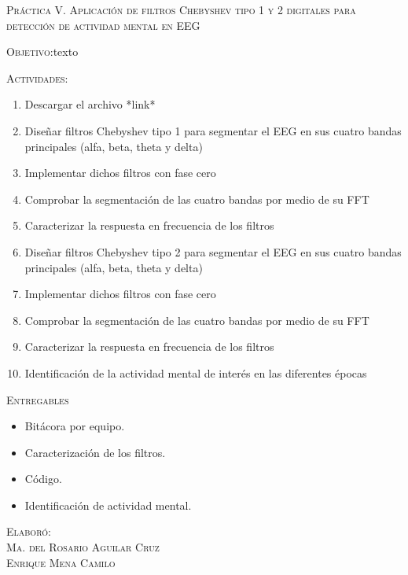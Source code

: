 \documentclass[10pt,letterpaper,spanish,twoside]{report}
\begin{document}
\docdate

\begin{center}
 \textsc{\asignatura}\vspace{.2em}
\end{center}

\textsc{Práctica V. Aplicación de filtros Chebyshev tipo 1 y 2 digitales para detección de actividad mental en EEG}

\textsc{Objetivo:}texto

\textsc{Actividades:}
\begin{enumerate}
  \item Descargar el archivo *link*
  \item Diseñar filtros Chebyshev tipo 1 para segmentar el EEG en sus cuatro bandas principales (alfa, beta, theta y delta)
  \item Implementar dichos filtros con fase cero
  \item Comprobar la segmentación de las cuatro bandas por medio de su FFT
  \item Caracterizar la respuesta en frecuencia de los filtros
  \item Diseñar filtros Chebyshev tipo 2 para segmentar el EEG en sus cuatro bandas principales (alfa, beta, theta y delta)
  \item Implementar dichos filtros con fase cero
  \item Comprobar la segmentación de las cuatro bandas por medio de su FFT
  \item Caracterizar la respuesta en frecuencia de los filtros
  \item Identificación de la actividad mental de interés en las diferentes épocas
\end{enumerate}

\textsc{Entregables}
\begin{itemize}
  \item Bitácora por equipo.
  \item Caracterización de los filtros.
  \item Código.
  \item Identificación de actividad mental.
\end{itemize}

\vfill
\begin{flushright}
\textsc{Elaboró:\\
Ma. del Rosario Aguilar Cruz\\
Enrique Mena Camilo}
\end{flushright}
\end{document}
